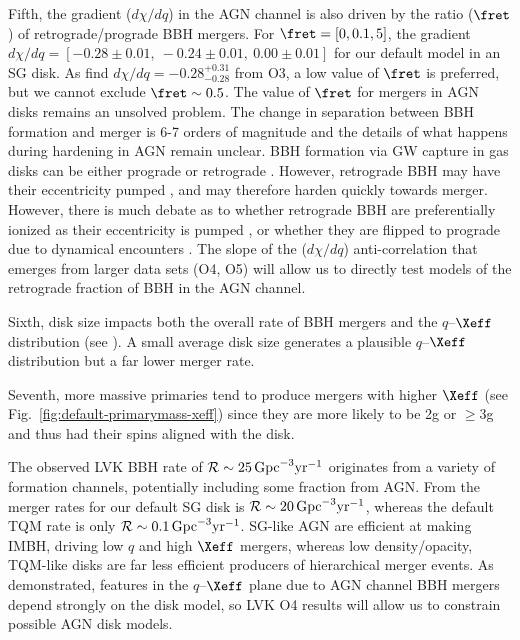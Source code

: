 Fifth, the gradient ($d\chi/dq$) in the AGN channel is also driven by the ratio ($\fret$) of retrograde/prograde BBH mergers.
For $\fret=[0,0.1,5]$, the gradient $d\chi/dq=[-0.28\pm0.01,\ -0.24\pm0.01,\ 0.00\pm0.01]$ for our default model in an SG disk.
As \citet{Callister+21} find $d\chi/dq = -0.28^{+0.31}_{-0.28}$ from O3, a low value of $\fret$ is preferred, but we cannot exclude $\fret \sim 0.5$.
The value of $\fret$ for mergers in AGN disks remains an unsolved problem.
The change in separation between BBH formation and merger is 6-7 orders of magnitude and the details of what happens during hardening in AGN remain unclear.
BBH formation via GW capture in gas disks can be either prograde or retrograde \citep[e.g.][]{DeLaurentiis+23,Whitehead+24,QianLiLai24}.
However, retrograde BBH may have their eccentricity pumped \citep{Li+22-bbh-evo,Calcino+23}, and may therefore harden quickly towards merger.
However, there is much debate as to whether retrograde BBH are preferentially ionized as their eccentricity is pumped \citep{Wang+21}, or whether they are flipped to prograde due to dynamical encounters \citep{Samsing+22,McKernanFord24}.
The slope of the ($d\chi/dq$) anti-correlation that emerges from larger data sets (O4, O5) will allow us to directly test models of the retrograde fraction of BBH in the AGN channel.

Sixth, disk size impacts both the overall rate of BBH mergers and the $q$--$\Xeff$ distribution (see ).
A small average disk size generates a plausible $q$--$\Xeff$ distribution but a far lower merger rate.

Seventh, more massive primaries tend to produce mergers with higher $\Xeff$ (see Fig.~\ref{fig:default-primarymass-xeff}) since they are more likely to be 2g or $\geq$3g and thus had their spins aligned with the disk.

The observed LVK BBH rate of $\mathcal{R} \sim 25\,{\rm Gpc}^{-3} {\rm yr}^{-1}$ \citep{Abbott+23-O3b} originates from a variety of formation channels, potentially including some fraction from AGN.
From \citet{McKernan+25-mcfactsI} the merger rates for our default SG disk is $\mathcal{R} \sim 20\,{\rm Gpc}^{-3} \rm{yr}^{-1}$, whereas the default TQM rate is only $\mathcal{R} \sim 0.1\,{\rm Gpc}^{-3} \rm{yr}^{-1}$.
SG-like AGN are efficient at making IMBH, driving low $q$ and high $\Xeff$ mergers, whereas low density/opacity, TQM-like disks are far less efficient producers of hierarchical merger events.
As demonstrated, features in the $q$--$\Xeff$ plane due to AGN channel BBH mergers depend strongly on the disk model, so LVK O4 results will allow us to constrain possible AGN disk models.


